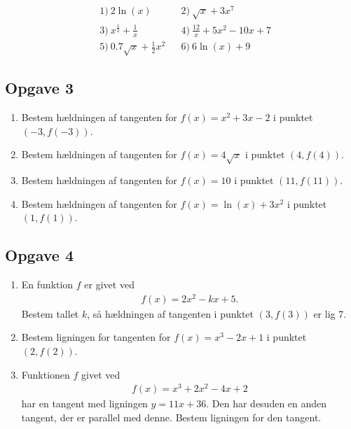\begin{align*}
	&1) \ 2\ln(x)  &&2) \ \sqrt{x}+ 3x^7     \\
	&3) \ x^\frac{1}{2} + \frac{1}{x} &&4) \  \frac{12}{x}+5x^2-10x+7    \\ 
	&5) \ 0.7\sqrt{x}+\frac{1}{2}x^2  &&6) \  6\ln(x)+9    
\end{align*}

\subsection*{Opgave 3}
\begin{enumerate}[label=\roman*)]
	\item Bestem hældningen af tangenten for $f(x) = x^2+3x-2$ i punktet $(-3,f(-3))$. 
	\item Bestem hældningen af tangenten for $f(x) = 4\sqrt{x}$ i punktet $(4,f(4))$.
	\item Bestem hældningen af tangenten for $f(x) = 10$ i punktet $(11,f(11))$.
	\item Bestem hældningen af tangenten for $f(x) = \ln(x) + 3x^2$ i punktet $(1,f(1))$. 
\end{enumerate}

\subsection*{Opgave 4}

\begin{enumerate}[label=\roman*)]
	\item En funktion $f$ er givet ved
	\begin{align*}
		f(x)=2x^2-kx+ 5.
	\end{align*}
	Bestem tallet $k$, så hældningen af tangenten i punktet $(3,f(3))$ er lig 7.
	\item Bestem ligningen for tangenten for $f(x) = x^3 - 2x + 1$ i punktet $(2,f(2))$.
	\item Funktionen $f$ givet ved
	\begin{align*}
		f(x) = x^3+2x^2-4x+2 
	\end{align*}
	har en tangent med ligningen $y = 11x + 36$. Den har desuden en anden tangent, der er parallel med denne. 
	Bestem ligningen for den tangent. 
\end{enumerate}
